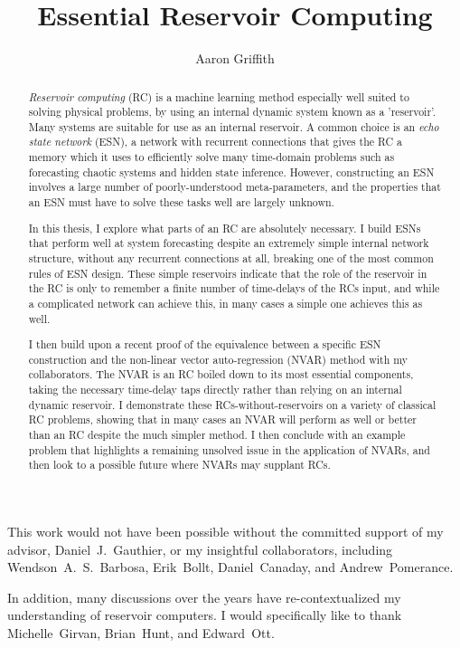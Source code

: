 \documentclass[11pt,draft,phd]{osudiss-2}
\title{Essential Reservoir Computing}
\author{Aaron Griffith}
\begin{document}
\frontmatter

\begin{abstract}

  \emph{Reservoir computing} (RC) is a machine learning method
  especially well suited to solving physical problems, by using an
  internal dynamic system known as a 'reservoir'. Many systems are
  suitable for use as an internal reservoir. A common choice is an
  \emph{echo state network} (ESN), a network with recurrent
  connections that gives the RC a memory which it uses to efficiently
  solve many time-domain problems such as forecasting chaotic systems
  and hidden state inference. However, constructing an ESN involves a
  large number of poorly-understood meta-parameters, and the properties
  that an ESN must have to solve these tasks well are largely unknown.

  In this thesis, I explore what parts of an RC are absolutely
  necessary. I build ESNs that perform well at system forecasting
  despite an extremely simple internal network structure, without any
  recurrent connections at all, breaking one of the most common rules
  of ESN design. These simple reservoirs indicate that the role of the
  reservoir in the RC is only to remember a finite number of
  time-delays of the RCs input, and while a complicated network can
  achieve this, in many cases a simple one achieves this as well.

  I then build upon a recent proof of the equivalence between a
  specific ESN construction and the non-linear vector auto-regression
  (NVAR) method with my collaborators. The NVAR is an RC boiled down
  to its most essential components, taking the necessary time-delay
  taps directly rather than relying on an internal dynamic
  reservoir. I demonstrate these RCs-without-reservoirs on a variety
  of classical RC problems, showing that in many cases an NVAR will
  perform as well or better than an RC despite the much simpler
  method. I then conclude with an example problem that highlights a
  remaining unsolved issue in the application of NVARs, and then look
  to a possible future where NVARs may supplant RCs.
\end{abstract}

\dedication{For my brother Nathan, and my parents Gregory and Mary Lea.}

\begin{acknowledgments}
  This work would not have been possible without the committed support
  of my advisor, Daniel~J.~Gauthier, or my insightful collaborators,
  including Wendson~A.~S.~Barbosa, Erik~Bollt, Daniel~Canaday, and Andrew~Pomerance.

  In addition, many discussions over the years have
  re-contextualized my understanding of reservoir computers. I would
  specifically like to thank Michelle~Girvan, Brian~Hunt, and Edward~Ott.
\end{acknowledgments}
\end{document}
